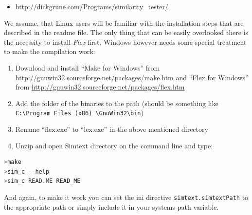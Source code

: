 \begin{itemize}
\item \url{http://dickgrune.com/Programs/similarity_tester/}
\end{itemize} 

We assume, that Linux users will be familiar with the installation steps that are described in the readme file. The only
thing that can be easily overlooked there is the necessity to install \textit{Flex} first. Windows
however needs some special treatment to make the compilation work:

\begin{enumerate}
\item Download and install \enquote{Make for Windows} from \url{http://gnuwin32.sourceforge.net/packages/make.htm} and 
\enquote{Flex for Windows} from \url{http://gnuwin32.sourceforge.net/packages/flex.htm}
\item Add the folder of the binaries to the path (should be something like 
\texttt{C:\textbackslash Program Files (x86) \textbackslash GnuWin32\textbackslash bin})
\item Rename \enquote{flex.exe} to \enquote{lex.exe} in the above mentioned directory
\item Unzip and open Simtext directory on the command line and type:
\end{enumerate}
\begin{lstlisting}[caption=Installing and checking simtext, language=bash]
>make
>sim_c --help
>sim_c READ.ME READ_ME
\end{lstlisting}

And again, to make it work you can set the ini directive \texttt{simtext.simtextPath} to the appropriate path or simply
include it in your systems path variable.
